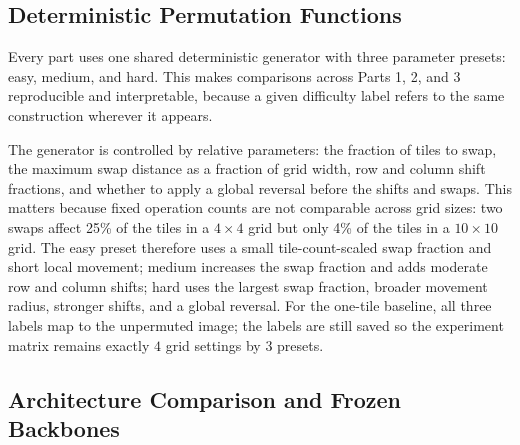 \documentclass[12pt]{article}
\begin{document}
\subsection{Deterministic Permutation Functions}

Every part uses one shared deterministic generator with three parameter presets: easy, medium, and hard. This makes comparisons across Parts 1, 2, and 3 reproducible and interpretable, because a given difficulty label refers to the same construction wherever it appears.

The generator is controlled by relative parameters: the fraction of tiles to swap, the maximum swap distance as a fraction of grid width, row and column shift fractions, and whether to apply a global reversal before the shifts and swaps. This matters because fixed operation counts are not comparable across grid sizes: two swaps affect 25\% of the tiles in a $4 \times 4$ grid but only 4\% of the tiles in a $10 \times 10$ grid. The easy preset therefore uses a small tile-count-scaled swap fraction and short local movement; medium increases the swap fraction and adds moderate row and column shifts; hard uses the largest swap fraction, broader movement radius, stronger shifts, and a global reversal. For the one-tile baseline, all three labels map to the unpermuted image; the labels are still saved so the experiment matrix remains exactly $4$ grid settings by $3$ presets.

\begin{table}[t]
  \centering
  \small
  \caption{Deterministic permutation preset parameters, as defined in \texttt{tile\_permutations.py}.}
  \label{tab:permutation-presets}
\end{table}

\subsection{Architecture Comparison and Frozen Backbones}
\end{document}
